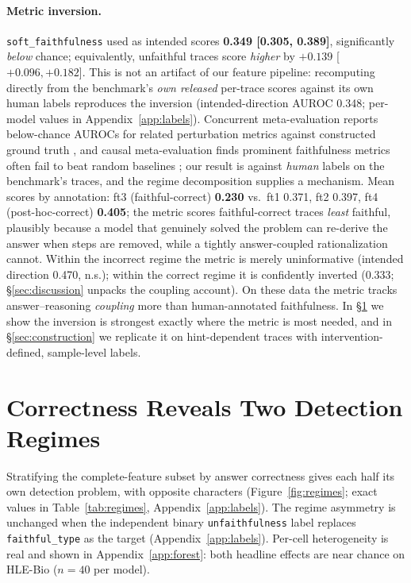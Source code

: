 \documentclass{article}
\begin{document}
\paragraph{Metric inversion.} \texttt{soft\_faithfulness} used as intended scores \textbf{0.349 [0.305, 0.389]}, significantly \emph{below} chance; equivalently, unfaithful traces score \emph{higher} by $+0.139$ [$+0.096, +0.182$]. This is not an artifact of our feature pipeline: recomputing directly from the benchmark's \emph{own released} per-trace scores against its own human labels reproduces the inversion (intended-direction AUROC 0.348; per-model values in Appendix~\ref{app:labels}). Concurrent meta-evaluation reports below-chance AUROCs for related perturbation metrics against constructed ground truth \citep{gurarieh2026bonafide}, and causal meta-evaluation finds prominent faithfulness metrics often fail to beat random baselines \citep{zaman2025causal}; our result is against \emph{human} labels on the benchmark's traces, and the regime decomposition supplies a mechanism. Mean scores by annotation: ft3 (faithful-correct) \textbf{0.230} vs.\ ft1 0.371, ft2 0.397, ft4 (post-hoc-correct) \textbf{0.405}; the metric scores faithful-correct traces \emph{least} faithful, plausibly because a model that genuinely solved the problem can re-derive the answer when steps are removed, while a tightly answer-coupled rationalization cannot. Within the incorrect regime the metric is merely uninformative (intended direction 0.470, n.s.); within the correct regime it is confidently inverted (0.333; \S\ref{sec:discussion} unpacks the coupling account). On these data the metric tracks answer--reasoning \emph{coupling} more than human-annotated faithfulness. In \S\ref{sec:regimes} we show the inversion is strongest exactly where the metric is most needed, and in \S\ref{sec:construction} we replicate it on hint-dependent traces with intervention-defined, sample-level labels.

\section{Correctness Reveals Two Detection Regimes}
\label{sec:regimes}

Stratifying the complete-feature subset by answer correctness gives each half its own detection problem, with opposite characters (Figure~\ref{fig:regimes}; exact values in Table~\ref{tab:regimes}, Appendix~\ref{app:labels}). The regime asymmetry is unchanged when the independent binary \texttt{unfaithfulness} label replaces \texttt{faithful\_type} as the target (Appendix~\ref{app:labels}). Per-cell heterogeneity is real and shown in Appendix~\ref{app:forest}: both headline effects are near chance on HLE-Bio ($n{=}40$ per model).
\end{document}
